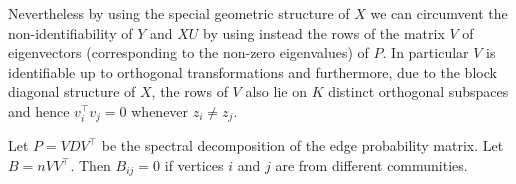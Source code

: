 \documentclass[12pt]{article}
\begin{document}
Nevertheless by using the special geometric structure of $X$ we can circumvent the
non-identifiability of $Y$ and $XU$ by using instead the rows of the
matrix $V$ of eigenvectors (corresponding to the non-zero eigenvalues) of $P$. In particular $V$ is identifiable
up to orthogonal transformations and furthermore, due to the block
diagonal structure of $X$, the rows of $V$ also lie on $K$ distinct orthogonal
subspaces and hence $v_i^{\top} v_j = 0$ whenever $z_i \not = z_j$. 
\begin{theorem}
\label{theorem3}
Let $P = V D V^\top$ be the spectral decomposition of the edge probability
matrix. Let $B = n V V^\top$. Then $B_{ij} = 0$ if vertices $i$ and $j$ are
from different communities.
\end{theorem}
\end{document}
